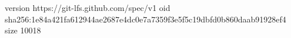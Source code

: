 version https://git-lfs.github.com/spec/v1
oid sha256:1e84a421fa612944ae2687e4dc0e7a7359f3e5f5c19dbfd0b860daab91928ef4
size 10018
